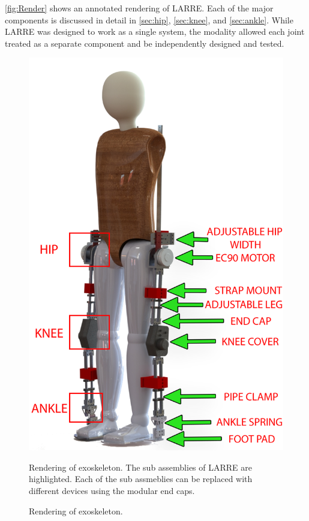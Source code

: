  \autoref{fig:Render} shows an annotated rendering of LARRE. Each of the major components is discussed in detail in  \autoref{sec:hip}, \autoref{sec:knee}, and \autoref{sec:ankle}. While LARRE was designed to work as a single system, the modality allowed each joint treated as a separate component and be independently designed and tested. 

\begin{figure}[h!]
    \centering
    \includegraphics[scale=0.25]{images/mech_design/rendering2.png}
    \caption{Rendering of exoskeleton.}{Rendering of exoskeleton. The sub assemblies of LARRE are highlighted. Each of the sub assmeblies can be replaced with different devices using the modular end caps.}
    \label{fig:Render}
\end{figure}

